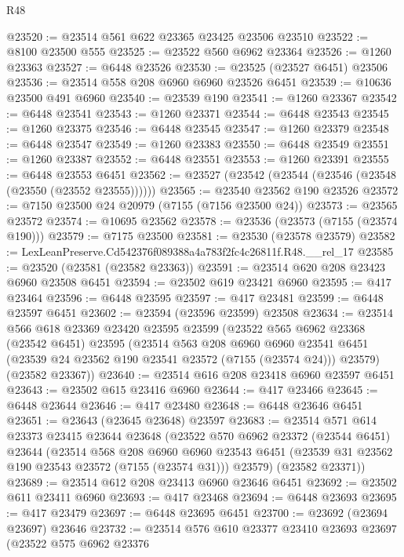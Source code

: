 \begin{lexlean}{R48}
\begin{coremodule}
@23520 := @23514 @561 @622 @23365 @23425 @23506 @23510
@23522 := @8100 @23500 @555
@23525 := @23522 @560 @6962 @23364
@23526 := @1260 @23363
@23527 := @6448 @23526
@23530 := @23525 (@23527 @6451) @23506
@23536 := @23514 @558 @208 @6960 @6960 @23526 @6451
@23539 := @10636 @23500 @491 @6960
@23540 := @23539 @190
@23541 := @1260 @23367
@23542 := @6448 @23541
@23543 := @1260 @23371
@23544 := @6448 @23543
@23545 := @1260 @23375
@23546 := @6448 @23545
@23547 := @1260 @23379
@23548 := @6448 @23547
@23549 := @1260 @23383
@23550 := @6448 @23549
@23551 := @1260 @23387
@23552 := @6448 @23551
@23553 := @1260 @23391
@23555 := @6448 @23553 @6451
@23562 := @23527 (@23542 (@23544 (@23546 (@23548 (@23550 (@23552 @23555))))))
@23565 := @23540 @23562 @190 @23526
@23572 := @7150 @23500 @24 @20979 (@7155 (@7156 @23500 @24))
@23573 := @23565 @23572
@23574 := @10695 @23562
@23578 := @23536 (@23573 (@7155 (@23574 @190)))
@23579 := @7175 @23500
@23581 := @23530 (@23578 @23579)
@23582 := LexLeanPreserve.Cd542376f089388a4a783f2fc4c26811f.R48.__rel_17
@23585 := @23520 (@23581 (@23582 @23363))
@23591 := @23514 @620 @208 @23423 @6960 @23508 @6451
@23594 := @23502 @619 @23421 @6960
@23595 := @417 @23464
@23596 := @6448 @23595
@23597 := @417 @23481
@23599 := @6448 @23597 @6451
@23602 := @23594 (@23596 @23599) @23508
@23634 := @23514
    @566
    @618
    @23369
    @23420
    @23595
    @23599
    (@23522
      @565
      @6962
      @23368
      (@23542 @6451)
      @23595
      (@23514
        @563
        @208
        @6960
        @6960
        @23541
        @6451
        (@23539 @24 @23562 @190 @23541 @23572 (@7155 (@23574 @24)))
        @23579)
      (@23582 @23367))
@23640 := @23514 @616 @208 @23418 @6960 @23597 @6451
@23643 := @23502 @615 @23416 @6960
@23644 := @417 @23466
@23645 := @6448 @23644
@23646 := @417 @23480
@23648 := @6448 @23646 @6451
@23651 := @23643 (@23645 @23648) @23597
@23683 := @23514
    @571
    @614
    @23373
    @23415
    @23644
    @23648
    (@23522
      @570
      @6962
      @23372
      (@23544 @6451)
      @23644
      (@23514
        @568
        @208
        @6960
        @6960
        @23543
        @6451
        (@23539 @31 @23562 @190 @23543 @23572 (@7155 (@23574 @31)))
        @23579)
      (@23582 @23371))
@23689 := @23514 @612 @208 @23413 @6960 @23646 @6451
@23692 := @23502 @611 @23411 @6960
@23693 := @417 @23468
@23694 := @6448 @23693
@23695 := @417 @23479
@23697 := @6448 @23695 @6451
@23700 := @23692 (@23694 @23697) @23646
@23732 := @23514
    @576
    @610
    @23377
    @23410
    @23693
    @23697
    (@23522
      @575
      @6962
      @23376

\end{coremodule}
\end{lexlean}
